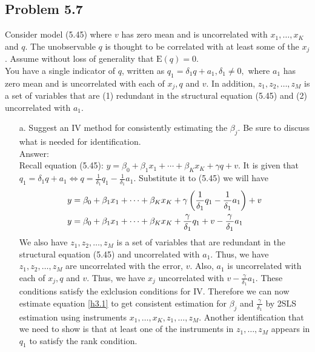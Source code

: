 \documentclass[10pt]{article}
\newcommand{\E}{\text{E}}
\begin{document}
\subsection*{Problem 5.7}
Consider model (5.45) where $v$ has zero mean and is uncorrelated with $x_1,\ldots,x_K$ and $q$. The unobservable $q$ is thought to be correlated with at least some of the $x_j$. Assume without loss of generality that $\E(q)=0.$\\
You have a single indicator of $q$, written as $q_1=\delta_1q+a_1,\delta_1\neq 0,$ where $a_1$ has zero mean and is uncorrelated with each of $x_j,q$ and $v$. In addition, $z_1,z_2,\ldots,z_M$ is a set of variables that are (1) redundant in the structural equation (5.45) and (2) uncorrelated with $a_1.$
\begin{enumerate}
\item[a.] Suggest an IV method for consistently estimating the $\beta_j.$ Be sure to discuss what is needed for identification.
\\ Answer:\\
Recall equation (5.45): $y=\beta_0+\beta_1x_1+\cdots+\beta_Kx_K+\gamma q+v.$
It is given that $q_1=\delta_1q+a_1 \Leftrightarrow q=\frac{1}{\delta_1}q_1-\frac{1}{\delta_1}a_1$. Substitute it to (5.45) we will have
\begin{align}
    y&=\beta_0+\beta_1x_1+\cdots+\beta_Kx_K+\gamma \left(\frac{1}{\delta_1}q_1-\frac{1}{\delta_1}a_1\right)+v \notag \\
    y&=\beta_0+\beta_1x_1+\cdots+\beta_Kx_K+\frac{\gamma}{\delta_1}q_1+v-\frac{\gamma}{\delta_1}a_1 \label{h3.1}
\end{align}
We also have $z_1,z_2,\ldots,z_M$ is a set of variables that are redundant in the structural equation (5.45) and uncorrelated with $a_1.$ Thus, we have $z_1,z_2,\ldots,z_M$ are uncorrelated with the error, $v$. Also, $a_1$ is uncorrelated with each of $x_j,q$ and $v$. Thus, we have $x_j$ uncorrelated with $v-\frac{\gamma}{\delta_1}a_1.$ These conditions satisfy the exlclusion conditions for IV. Therefore we can now estimate equation \eqref{h3.1} to get consistent estimation for $\beta_j$ and $\frac{\gamma}{\delta_1}$ by 2SLS estimation using instruments $x_1,\ldots,x_K,z_1,\ldots,z_M.$ Another identification that we need to show is that at least one of the instruments in $z_1,\ldots,z_M$ appears in $q_1$ to satisfy the rank condition.


\end{enumerate}
\end{document}
